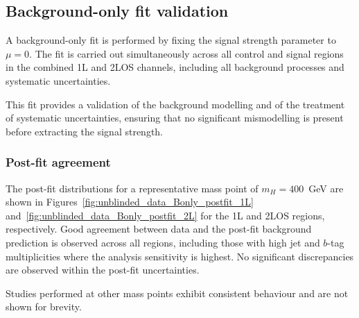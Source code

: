 ﻿\subsection{Background-only fit validation}
\label{sec:bonly_fit}

A background-only fit is performed by fixing the signal strength parameter to $\mu=0$. 
The fit is carried out simultaneously across all control and signal regions in the combined 1L and 2LOS channels, including all background processes and systematic uncertainties. 

This fit provides a validation of the background modelling and of the treatment of systematic uncertainties, ensuring that no significant mismodelling is present before extracting the signal strength.

\subsubsection*{\textbf{Post-fit agreement}}

The post-fit distributions for a representative mass point of $m_H=400$~GeV are shown in Figures~\ref{fig:unblinded_data_Bonly_postfit_1L} and~\ref{fig:unblinded_data_Bonly_postfit_2L} for the 1L and 2LOS regions, respectively. 
Good agreement between data and the post-fit background prediction is observed across all regions, including those with high jet and $b$-tag multiplicities where the analysis sensitivity is highest. 
No significant discrepancies are observed within the post-fit uncertainties.

Studies performed at other mass points exhibit consistent behaviour and are not shown for brevity.

